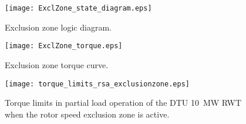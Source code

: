 \begin{figure}[t]
\centerline{
\texttt{[image: ExclZone\_state\_diagram.eps]} }
\caption{Exclusion zone logic diagram. \label{f:EZ_SD}}
\end{figure}

\begin{figure}[t]
\centerline{
\texttt{[image: ExclZone\_torque.eps]} }
\caption{Exclusion zone torque curve. \label{f:EZ_torque}}
\end{figure}

\begin{figure}[t]
\centerline{
\texttt{[image: torque\_limits\_rsa\_exclusionzone.eps]} }
\caption{Torque limits in partial load operation of the DTU 10~MW RWT when the rotor speed exclusion zone is active. \label{f:EZ_torque_limits}}
\end{figure}






